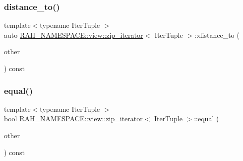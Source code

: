 \mbox{\label{struct_r_a_h___n_a_m_e_s_p_a_c_e_1_1view_1_1zip__iterator_a28cd083a5e51f545237c1fb8f7945522}} 
\subsubsection{\texorpdfstring{distance\_to()}{distance\_to()}}
{\footnotesize\ttfamily template$<$typename Iter\+Tuple $>$ \\
auto \mbox{\hyperlink{struct_r_a_h___n_a_m_e_s_p_a_c_e_1_1view_1_1zip__iterator}{R\+A\+H\+\_\+\+N\+A\+M\+E\+S\+P\+A\+C\+E\+::view\+::zip\+\_\+iterator}}$<$ Iter\+Tuple $>$\+::distance\+\_\+to (\begin{DoxyParamCaption}\item[{\mbox{\hyperlink{struct_r_a_h___n_a_m_e_s_p_a_c_e_1_1view_1_1zip__iterator}{zip\+\_\+iterator}}$<$ Iter\+Tuple $>$}]{other }\end{DoxyParamCaption}) const\hspace{0.3cm}{\ttfamily [inline]}}

\mbox{\label{struct_r_a_h___n_a_m_e_s_p_a_c_e_1_1view_1_1zip__iterator_ace4ecabc960b0b1a1ddb032e4f5a6668}} 
\subsubsection{\texorpdfstring{equal()}{equal()}}
{\footnotesize\ttfamily template$<$typename Iter\+Tuple $>$ \\
bool \mbox{\hyperlink{struct_r_a_h___n_a_m_e_s_p_a_c_e_1_1view_1_1zip__iterator}{R\+A\+H\+\_\+\+N\+A\+M\+E\+S\+P\+A\+C\+E\+::view\+::zip\+\_\+iterator}}$<$ Iter\+Tuple $>$\+::equal (\begin{DoxyParamCaption}\item[{\mbox{\hyperlink{struct_r_a_h___n_a_m_e_s_p_a_c_e_1_1view_1_1zip__iterator}{zip\+\_\+iterator}}$<$ Iter\+Tuple $>$}]{other }\end{DoxyParamCaption}) const\hspace{0.3cm}{\ttfamily [inline]}}


